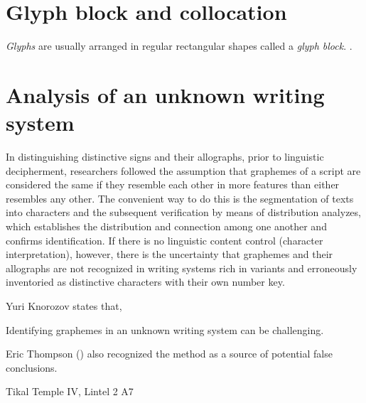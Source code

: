 \documentclass[../main.tex]{subfiles}
\begin{document}
\section{Glyph block and collocation}
\emph{Glyphs} are usually arranged in regular rectangular shapes called a \emph{glyph block}.
.

\section{Analysis of an unknown writing system}
In distinguishing distinctive signs and their allographs, prior to linguistic decipherment, 
researchers followed the assumption that graphemes of a script are considered the same if 
they resemble each other in more features than either resembles any other.
The convenient way to do this is the segmentation of texts into characters and the subsequent 
verification by means of distribution analyzes, which establishes the distribution and 
connection among one another and confirms identification. 
If there is no linguistic content control (character interpretation), 
however, there is the uncertainty that graphemes and 
their allographs are not recognized in writing systems rich in variants and erroneously 
inventoried as distinctive characters with their own number key.


Yuri Knorozov states that, 



Identifying graphemes in an unknown writing system can be challenging.




Eric Thompson (\cite[12\psq]{thompson1962catalog}) also recognized the method as a source of 
potential false conclusions.


Tikal Temple IV, Lintel 2 A7
\end{document}
